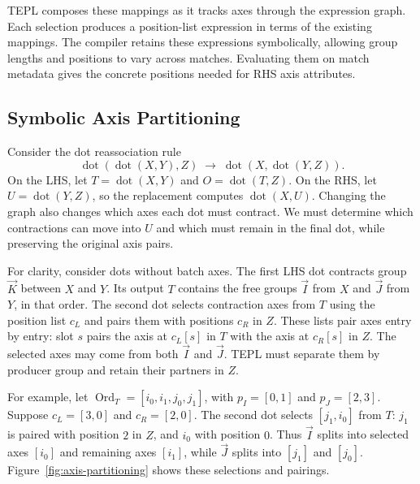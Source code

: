 TEPL composes these mappings as it tracks axes through the expression
graph. Each selection produces a position-list expression in terms of
the existing mappings. The compiler retains these expressions
symbolically, allowing group lengths and positions to vary across
matches. Evaluating them on match metadata gives the concrete positions
needed for RHS axis attributes.

\subsection{Symbolic Axis Partitioning}
\label{sec:symbolic-axis-partitioning}
Consider the dot reassociation rule
\[
 \operatorname{dot}(\operatorname{dot}(X,Y),Z)
 \;\longrightarrow\;
 \operatorname{dot}(X,\operatorname{dot}(Y,Z)).
\]
On the LHS, let $T=\operatorname{dot}(X,Y)$ and
$O=\operatorname{dot}(T,Z)$. On the RHS, let
$U=\operatorname{dot}(Y,Z)$, so the replacement computes
$\operatorname{dot}(X,U)$.
Changing the graph also changes which axes each dot must contract.
We must determine which contractions can move into $U$ and which
must remain in the final dot, while preserving the original axis pairs.

For clarity, consider dots without batch axes.
The first LHS dot contracts group $\vec K$ between $X$ and $Y$.
Its output $T$ contains the free groups $\vec I$ from $X$ and
$\vec J$ from $Y$, in that order.
The second dot selects contraction axes from $T$ using the position
list $c_L$ and pairs them with positions $c_R$ in $Z$.
These lists pair axes entry by entry: slot $s$ pairs the axis at
$c_L[s]$ in $T$ with the axis at $c_R[s]$ in $Z$.
The selected axes may come from both $\vec I$ and $\vec J$.
TEPL must separate them by producer group and retain their partners
in $Z$.

For example, let
$\operatorname{Ord}_T=[i_0,i_1,j_0,j_1]$, with
$p_I=[0,1]$ and $p_J=[2,3]$.
Suppose $c_L=[3,0]$ and $c_R=[2,0]$.
The second dot selects $[j_1,i_0]$ from $T$:
$j_1$ is paired with position $2$ in $Z$, and $i_0$ with position $0$.
Thus $\vec I$ splits into selected axes $[i_0]$ and remaining axes
$[i_1]$, while $\vec J$ splits into $[j_1]$ and $[j_0]$.
Figure~\ref{fig:axis-partitioning} shows these selections and pairings.


